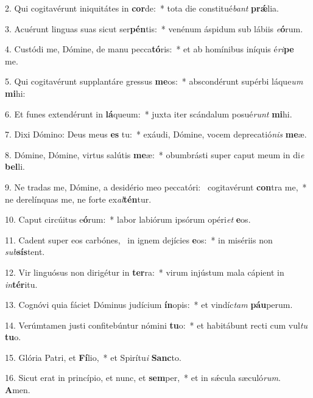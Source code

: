 2. Qui cogitavérunt iniquitátes in \textbf{cor}de:~*  tota die constitué\textit{bant} \textbf{prǽ}lia.\

3. Acuérunt linguas suas sicut ser\textbf{pén}tis:~*  venénum áspidum sub lábiis \textit{e}\textbf{ó}rum.\

4. Custódi me, Dómine, de manu pecca\textbf{tó}ris:~*  et ab homínibus iníquis é\textit{ri}\textbf{pe} me.\

5. Qui cogitavérunt supplantáre gressus \textbf{me}os:~*  abscondérunt supérbi láque\textit{um} \textbf{mi}hi:\

6. Et funes extendérunt in \textbf{lá}queum:~*  juxta iter scándalum posué\textit{runt} \textbf{mi}hi.\

7. Dixi Dómino: Deus meus \textbf{es} tu:~*  exáudi, Dómine, vocem deprecatió\textit{nis} \textbf{me}æ.\

8. Dómine, Dómine, virtus salútis \textbf{me}æ:~*  obumbrásti super caput meum in di\textit{e} \textbf{bel}li.\

9. Ne tradas me, Dómine, a desidério meo peccatóri: \dag\  cogitavérunt \textbf{con}tra me,~*  ne derelínquas me, ne forte ex\textit{al}\textbf{tén}tur.\

10. Caput circúitus e\textbf{ó}rum:~*  labor labiórum ipsórum opéri\textit{et} \textbf{e}os.\

11. Cadent super eos carbónes, \dag\  in ignem dejícies \textbf{e}os:~*  in misériis non \textit{sub}\textbf{sís}tent.\

12. Vir linguósus non dirigétur in \textbf{ter}ra:~*  virum injústum mala cápient in \textit{in}\textbf{tér}itu.\

13. Cognóvi quia fáciet Dóminus judícium \textbf{ín}opis:~*  et vindíc\textit{tam} \textbf{páu}perum.\

14. Verúmtamen justi confitebúntur nómini \textbf{tu}o:~*  et habitábunt recti cum vul\textit{tu} \textbf{tu}o.\

15. Glória Patri, et \textbf{Fí}lio,~*  et Spirítu\textit{i} \textbf{Sanc}to.\

16. Sicut erat in princípio, et nunc, et \textbf{sem}per,~*  et in sǽcula sæculó\textit{rum}. \textbf{A}men.\

